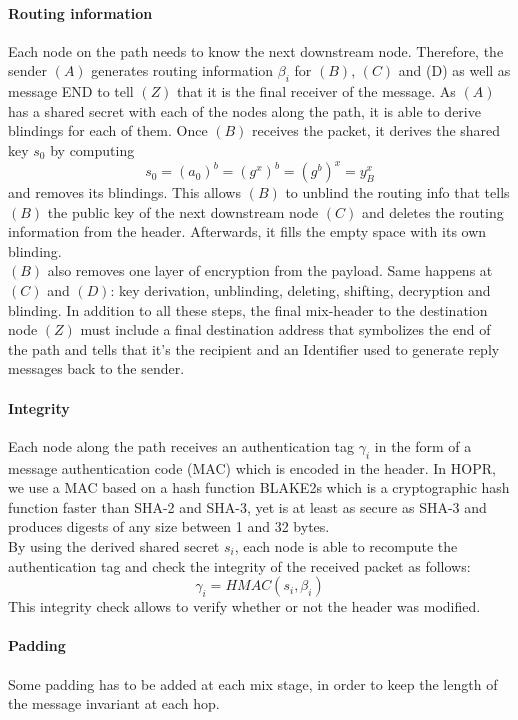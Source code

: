 \paragraph{Routing information}
Each node on the path needs to know the next downstream node. Therefore, the sender $(A)$ generates routing information $\beta_i$ for $(B)$, $(C)$ and (D) as well as message END to tell $(Z)$ that it is the final receiver of the message. 
\newline As $(A)$ has a shared secret with each of the nodes along the path, it is able to derive blindings for each of them.
\newline Once $(B)$ receives the packet, it derives the shared key $s_0$ by computing $$s_0=(a_0)^b=(g^x)^b=(g^b)^x=y^x_B$$ and removes its blindings. This allows $(B)$ to unblind the routing info that tells $(B)$ the public key of the next downstream node $(C)$ and deletes the routing information from the header. Afterwards, it fills the empty space with its own blinding.
\\$(B)$ also removes one layer of encryption from the payload.
Same happens at $(C)$ and $(D)$: key derivation, unblinding, deleting, shifting, decryption and blinding. 
In addition to all these steps, the final mix-header to the destination node $(Z)$ must include a final destination address that symbolizes the end of the path and tells that it’s the recipient and an Identifier used to generate reply messages back to the sender.

\paragraph{Integrity}
Each node along the path receives an authentication tag $\gamma_i$ in the form of a message authentication code (MAC)
which is encoded in the header. In HOPR, we use a MAC based on a hash function BLAKE2s which is a cryptographic hash function faster than SHA-2 and SHA-3, yet is at least as secure as SHA-3 and produces digests of any size between 1 and 32 bytes. 
\\By using the derived shared secret $s_i$, each node is able to recompute the authentication tag and check the integrity of the received packet as follows: $$\gamma_i=HMAC(s_i,\beta_i)$$
This integrity check allows to verify whether or not the header was modified.
\paragraph{Padding}
Some padding has to be added at each mix stage, in order to keep the length of the message invariant at each hop.

